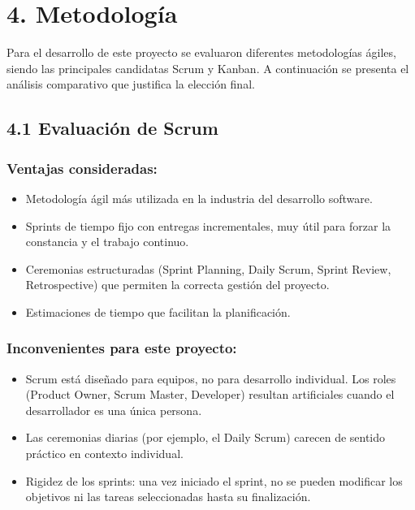 \section*{4. Metodología}

Para el desarrollo de este proyecto se evaluaron diferentes metodologías ágiles, siendo las principales candidatas Scrum y Kanban. A continuación se presenta el análisis comparativo que justifica la elección final.

\subsection{4.1 Evaluación de Scrum}

\subsubsection{Ventajas consideradas:}

\begin{itemize}
    \item Metodología ágil más utilizada en la industria del desarrollo software.
    \item Sprints de tiempo fijo con entregas incrementales, muy útil para forzar la constancia y el trabajo continuo.
    \item Ceremonias estructuradas (Sprint Planning, Daily Scrum, Sprint Review, Retrospective) que permiten la correcta gestión del proyecto.
    \item Estimaciones de tiempo que facilitan la planificación.
\end{itemize}

\subsubsection{Inconvenientes para este proyecto:}

\begin{itemize}
    \item Scrum está diseñado para equipos, no para desarrollo individual. Los roles (Product Owner, Scrum Master, Developer) resultan artificiales cuando el desarrollador es una única persona.
    \item Las ceremonias diarias (por ejemplo, el Daily Scrum) carecen de sentido práctico en contexto individual.
    \item Rigidez de los sprints: una vez iniciado el sprint, no se pueden modificar los objetivos ni las tareas seleccionadas hasta su finalización.
\end{itemize}

